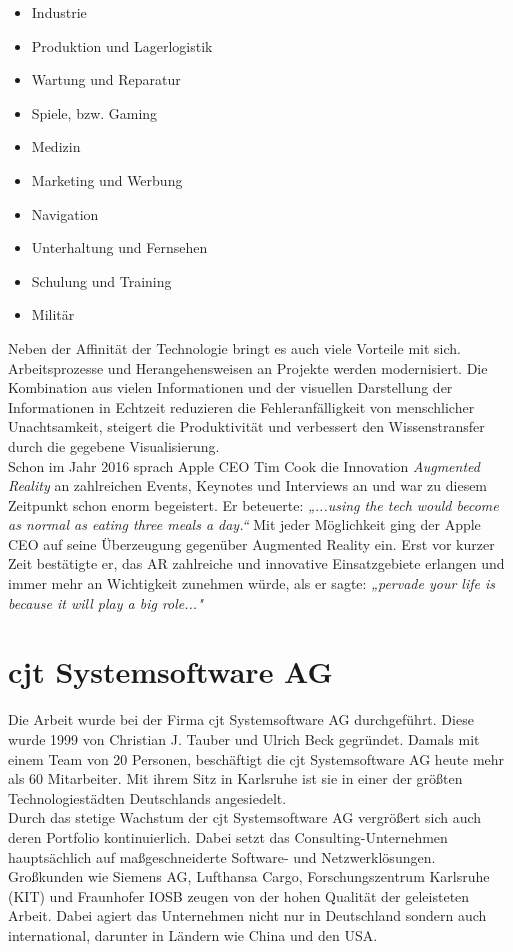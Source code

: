 \begin{itemize}
    \item Industrie 
    \item Produktion und Lagerlogistik
    \item Wartung und Reparatur
    \item Spiele, bzw. Gaming 
    \item Medizin
    \item Marketing und Werbung
    \item Navigation
    \item Unterhaltung und Fernsehen 
    \item Schulung und Training
    \item Militär
\end{itemize} 
Neben der Affinität der Technologie bringt es auch viele Vorteile mit sich. Arbeitsprozesse und Herangehensweisen an Projekte werden 
modernisiert. Die Kombination aus vielen Informationen und der visuellen Darstellung der Informationen in Echtzeit reduzieren die 
Fehleranfälligkeit von menschlicher Unachtsamkeit, steigert die Produktivität und verbessert den Wissenstransfer durch die gegebene 
Visualisierung. 
\\ 
\linebreak
Schon im Jahr 2016 sprach Apple CEO Tim Cook die Innovation \textit{Augmented Reality} an zahlreichen Events, Keynotes und Interviews 
an und war zu diesem Zeitpunkt schon enorm begeistert. Er beteuerte: \textit{„...using the tech would become as normal as eating three 
meals a day.“} \cite{timcook2016.2016o} Mit jeder Möglichkeit ging der Apple CEO auf seine Überzeugung gegenüber Augmented Reality ein. 
Erst vor kurzer Zeit bestätigte er, das AR zahlreiche und innovative Einsatzgebiete erlangen und immer mehr an Wichtigkeit zunehmen 
würde, als er sagte: \textit{„pervade your life is because it will play a big role..."} \cite{timcook.2020j}


\section{cjt Systemsoftware AG}
\label{chap:cjt}
Die Arbeit wurde bei der Firma cjt Systemsoftware AG durchgeführt. Diese wurde
1999 von Christian J. Tauber und Ulrich Beck gegründet. Damals mit einem Team
von 20 Personen, beschäftigt die cjt Systemsoftware AG heute mehr als 60 Mitarbeiter. 
Mit ihrem Sitz in Karlsruhe ist sie in einer der größten Technologiestädten Deutschlands angesiedelt.
\\
\linebreak
Durch das stetige Wachstum der cjt Systemsoftware AG vergrößert sich auch deren
Portfolio kontinuierlich. Dabei setzt das Consulting-Unternehmen hauptsächlich auf maßgeschneiderte
Software- und Netzwerklösungen. Großkunden wie Siemens AG, Lufthansa Cargo,
Forschungszentrum Karlsruhe (KIT) und Fraunhofer IOSB zeugen von der hohen Qualität der geleisteten Arbeit. 
Dabei agiert das Unternehmen nicht nur in Deutschland sondern auch international, darunter in Ländern wie China und den USA.

